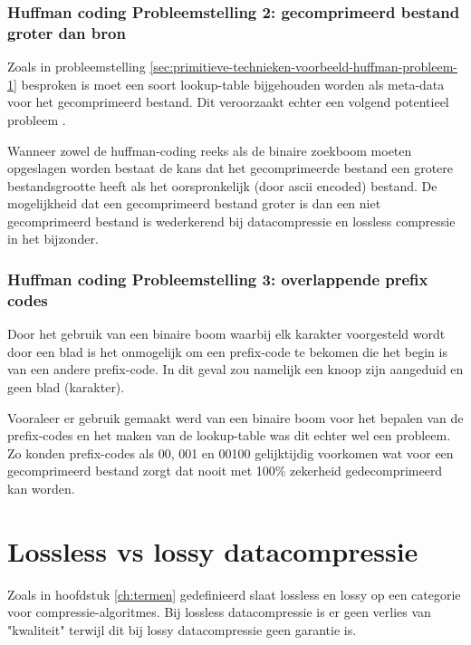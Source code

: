\subsubsection{Huffman coding Probleemstelling 2: gecomprimeerd bestand groter dan bron}
Zoals in probleemstelling \ref{sec:primitieve-technieken-voorbeeld-huffman-probleem-1} besproken is moet een soort \gls{lookup-table} bijgehouden worden als \gls{meta-data} voor het gecomprimeerd bestand. Dit veroorzaakt echter een volgend potentieel probleem .


Wanneer zowel de \gls{huffman-coding} reeks als de binaire zoekboom moeten opgeslagen worden bestaat de kans dat het gecomprimeerde bestand een grotere bestandsgrootte heeft als het oorspronkelijk (door \gls{ascii} encoded) bestand. De mogelijkheid dat een gecomprimeerd bestand groter is dan een niet gecomprimeerd bestand is wederkerend bij \gls{datacompressie} en \gls{lossless} compressie in het bijzonder.


\subsubsection{Huffman coding Probleemstelling 3: overlappende prefix codes}
\label{sec:primitieve-technieken-voorbeeld-huffman-probleem-3}
\label{sec:primitieve-technieken-voorbeeld-huffman-probleem-2}
Door het gebruik van een binaire boom waarbij elk karakter voorgesteld wordt door een blad is het onmogelijk om een \gls{prefix-code} te bekomen die het begin is van een andere \gls{prefix-code}. In dit geval zou namelijk een knoop zijn aangeduid en geen blad (karakter).

Vooraleer er gebruik gemaakt werd van een binaire boom voor het bepalen van de \glspl{prefix-code} en het maken van de \gls{lookup-table} was dit echter wel een probleem. Zo konden \glspl{prefix-code} als 00, 001 en 00100 gelijktijdig voorkomen wat voor een gecomprimeerd bestand zorgt dat nooit met 100\% zekerheid gedecomprimeerd kan worden.

\section{Lossless vs lossy datacompressie}
\label{sec:ontstaan-datacompressie-lossless-lossy}
Zoals in hoofdstuk \ref{ch:termen} gedefinieerd slaat \gls{lossless} en \gls{lossy} op een categorie voor \glspl{compressie-algoritme}.
Bij \gls{lossless} \gls{datacompressie} is er geen verlies van "kwaliteit" terwijl dit bij \gls{lossy} \gls{datacompressie} geen garantie is.

